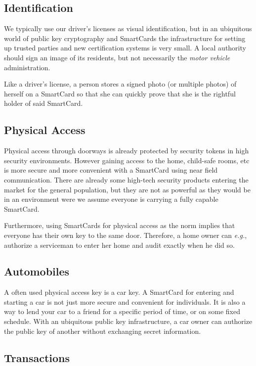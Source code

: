 \documentclass[11pt, twocolumn]{article}
\begin{document}
\subsection{Identification}

We typically use our driver's licenses as visual identification, but in an
ubiquitous world of public key cryptography and SmartCards the infrastructure
for setting up trusted parties and new certification systems is very small. A
local authority should sign an image of its residents, but not necessarily the
\textit{motor vehicle} administration.

Like a driver's license, a person stores a signed photo (or multiple photos) of
herself on a SmartCard so that she can quickly prove that she is the rightful
holder of said SmartCard.

\subsection{Physical Access}

Physical access through doorways is already protected by security tokens in high
security environments. However gaining access to the home, child-safe rooms, etc
is more secure and more convenient with a SmartCard using near field
communication. There are already some high-tech security products entering the
market for the general population, but they are not as powerful as they would be
in an environment were we assume everyone is carrying a fully capable SmartCard.

Furthermore, using SmartCards for physical access as the norm implies that
everyone has their own key to the same door. Therefore, a home owner can
\textit{e.g.}, authorize a serviceman to enter her home and audit exactly when
he did so.

\subsection{Automobiles}

A often used physical access key is a car key. A SmartCard for entering and
starting a car is not just more secure and convenient for individuals. It is
also a way to lend your car to a friend for a specific period of time, or on
some fixed schedule. With an ubiquitous public key infrastructure, a car owner
can authorize the public key of another without exchanging secret information.

\subsection{Transactions}
\end{document}
